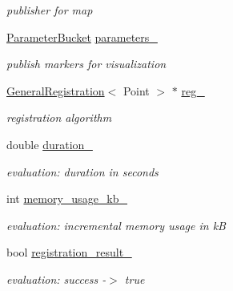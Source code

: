 \begin{DoxyCompactItemize}
\begin{DoxyCompactList}\small\item\em publisher for map \item\end{DoxyCompactList}\item 
\hyperlink{classParameterBucket}{ParameterBucket} \hyperlink{classRegistrationNode_a64f206a310aa231161d13fd7aa54380d}{parameters\_\-}
\begin{DoxyCompactList}\small\item\em publish markers for visualization \item\end{DoxyCompactList}\item 
\hypertarget{classRegistrationNode_af89c036128385228f4d74fc5908803e8}{
\hyperlink{classGeneralRegistration}{GeneralRegistration}$<$ Point $>$ $\ast$ \hyperlink{classRegistrationNode_af89c036128385228f4d74fc5908803e8}{reg\_\-}}
\label{classRegistrationNode_af89c036128385228f4d74fc5908803e8}

\begin{DoxyCompactList}\small\item\em registration algorithm \item\end{DoxyCompactList}\item 
\hypertarget{classRegistrationNode_af51e29db4f2f9abcedcb8a1c43396838}{
double \hyperlink{classRegistrationNode_af51e29db4f2f9abcedcb8a1c43396838}{duration\_\-}}
\label{classRegistrationNode_af51e29db4f2f9abcedcb8a1c43396838}

\begin{DoxyCompactList}\small\item\em evaluation: duration in seconds \item\end{DoxyCompactList}\item 
\hypertarget{classRegistrationNode_a8ae0191181e275268c82182c828e1842}{
int \hyperlink{classRegistrationNode_a8ae0191181e275268c82182c828e1842}{memory\_\-usage\_\-kb\_\-}}
\label{classRegistrationNode_a8ae0191181e275268c82182c828e1842}

\begin{DoxyCompactList}\small\item\em evaluation: incremental memory usage in kB \item\end{DoxyCompactList}\item 
\hypertarget{classRegistrationNode_a4630d8b7a3c1816e672f82897f3989b8}{
bool \hyperlink{classRegistrationNode_a4630d8b7a3c1816e672f82897f3989b8}{registration\_\-result\_\-}}
\label{classRegistrationNode_a4630d8b7a3c1816e672f82897f3989b8}

\begin{DoxyCompactList}\small\item\em evaluation: success -\/$>$ true \item\end{DoxyCompactList}\end{DoxyCompactItemize}


